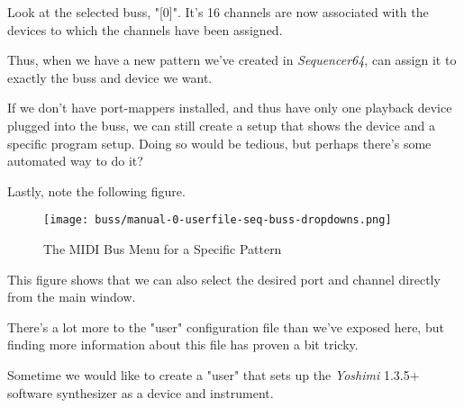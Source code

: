    Look at the selected buss, "[0]".  It's 16 channels are now associated with
   the devices to which the channels have been assigned.

   Thus, when we have a new pattern we've created in \textsl{Sequencer64},
   can assign it to exactly the buss and device we want.

   If we don't have port-mappers installed, and thus have only one playback
   device plugged into the buss, we can still create a setup that
   shows the device and a specific program setup.  Doing so would be tedious,
   but perhaps there's some automated way to do it?

   Lastly, note the following figure.

\begin{figure}[H]
   \centering 
   \texttt{[image: buss/manual-0-userfile-seq-buss-dropdowns.png]}
   \caption{The MIDI Bus Menu for a Specific Pattern}
   \label{fig:seq64_manual_0_userfile_seq_buss_dropdown}
\end{figure}

   This figure shows that we can also select the desired port and channel
   directly from the main window.

   There's a lot more to the "user" configuration file than we've exposed here,
   but finding more information about this file has proven a bit tricky.

   Sometime we would like to create a "user" that sets up the
   \textsl{Yoshimi} 1.3.5+ software synthesizer as a device and instrument.

